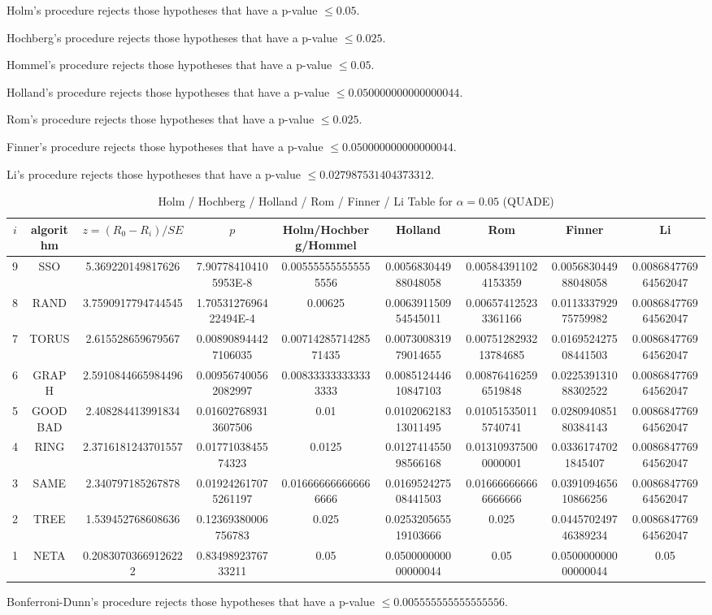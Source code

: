 \documentclass[a4paper,10pt]{article}
\begin{document}
\begin{landscape}
Holm's procedure rejects those hypotheses that have a p-value $\le0.05$.


Hochberg's procedure rejects those hypotheses that have a p-value $\le0.025$.


Hommel's procedure rejects those hypotheses that have a p-value $\le0.05$.


Holland's procedure rejects those hypotheses that have a p-value $\le0.050000000000000044$.


Rom's procedure rejects those hypotheses that have a p-value $\le0.025$.


Finner's procedure rejects those hypotheses that have a p-value $\le0.050000000000000044$.


Li's procedure rejects those hypotheses that have a p-value $\le0.027987531404373312$.



\newpage

\begin{table}[!htp]
\centering\scriptsize
\caption{Holm / Hochberg / Holland / Rom / Finner / Li Table for $\alpha=0.05$ (QUADE)}
\begin{tabular}{ccccccccc}
$i$&algorithm&$z=(R_0 - R_i)/SE$&$p$&Holm/Hochberg/Hommel&Holland&Rom&Finner&Li\\
\hline
9& SSO&5.369220149817626&7.907784104105953E-8&0.005555555555555556&0.005683044988048058&0.005843911024153359&0.005683044988048058&0.008684776964562047\\
8& RAND&3.7590917794744545&1.7053127696422494E-4&0.00625&0.006391150954545011&0.006574125233361166&0.011333792975759982&0.008684776964562047\\
7& TORUS&2.615528659679567&0.008908944427106035&0.0071428571428571435&0.007300831979014655&0.0075128293213784685&0.016952427508441503&0.008684776964562047\\
6& GRAPH&2.5910844665984496&0.009567400562082997&0.008333333333333333&0.008512444610847103&0.008764162596519848&0.022539131088302522&0.008684776964562047\\
5& GOODBAD&2.408284413991834&0.016027689313607506&0.01&0.010206218313011495&0.010515350115740741&0.028094085180384143&0.008684776964562047\\
4& RING&2.3716181243701557&0.0177103845574323&0.0125&0.012741455098566168&0.013109375000000001&0.03361747021845407&0.008684776964562047\\
3& SAME&2.340797185267878&0.019242617075261197&0.016666666666666666&0.016952427508441503&0.016666666666666666&0.039109465610866256&0.008684776964562047\\
2& TREE&1.539452768608636&0.12369380006756783&0.025&0.025320565519103666&0.025&0.044570249746389234&0.008684776964562047\\
1& NETA&0.20830703669126222&0.8349892376733211&0.05&0.050000000000000044&0.05&0.050000000000000044&0.05\\
\hline
\end{tabular}
\end{table}
Bonferroni-Dunn's procedure rejects those hypotheses that have a p-value $\le0.005555555555555556$.



\end{landscape}
\end{document}
